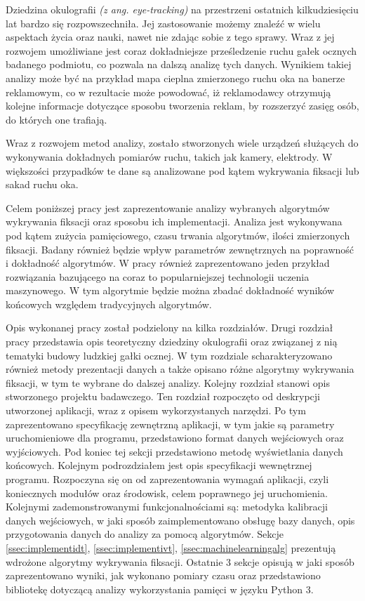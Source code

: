 Dziedzina okulografii \textit{(z ang. eye-tracking)} na przestrzeni ostatnich kilkudziesięciu lat bardzo się rozpowszechniła. Jej zastosowanie możemy znaleźć w wielu aspektach życia oraz nauki, nawet nie zdając sobie z tego sprawy. Wraz z jej rozwojem umożliwiane jest coraz dokładniejsze prześledzenie ruchu gałek ocznych badanego podmiotu, co pozwala na dalszą analizę tych danych. Wynikiem takiej analizy może być na przykład mapa cieplna zmierzonego ruchu oka na banerze reklamowym, co w rezultacie może powodować, iż reklamodawcy otrzymują kolejne informacje dotyczące sposobu tworzenia reklam, by rozszerzyć zasięg osób, do których one trafiają.\par
Wraz z rozwojem metod analizy, zostało stworzonych wiele urządzeń służących do wykonywania dokładnych pomiarów ruchu, takich jak kamery, elektrody. W większości przypadków te dane są analizowane pod kątem wykrywania fiksacji lub sakad ruchu oka.\par
Celem poniższej pracy jest zaprezentowanie analizy wybranych algorytmów wykrywania fiksacji oraz sposobu ich implementacji. Analiza jest wykonywana pod kątem zużycia pamięciowego, czasu trwania algorytmów, ilości zmierzonych fiksacji. Badany również będzie wpływ parametrów zewnętrznych na poprawność i dokładność algorytmów. W pracy również zaprezentowano jeden przykład rozwiązania bazującego na coraz to popularniejszej technologii uczenia maszynowego. W tym algorytmie będzie można zbadać dokładność wyników końcowych względem tradycyjnych algorytmów.\par
Opis wykonanej pracy został podzielony na kilka rozdziałów. Drugi rozdział pracy przedstawia opis teoretyczny dziedziny okulografii oraz związanej z nią tematyki budowy ludzkiej gałki ocznej. W tym rozdziale scharakteryzowano również metody prezentacji danych a także opisano różne algorytmy wykrywania fiksacji, w tym te wybrane do dalszej analizy. Kolejny rozdział stanowi opis stworzonego projektu badawczego. Ten rozdział rozpoczęto od deskrypcji utworzonej aplikacji, wraz z opisem wykorzystanych narzędzi. Po tym zaprezentowano specyfikację zewnętrzną aplikacji, w tym jakie są parametry uruchomieniowe dla programu, przedstawiono format danych wejściowych oraz wyjściowych. Pod koniec tej sekcji przedstawiono metodę wyświetlania danych końcowych. Kolejnym podrozdziałem jest opis specyfikacji wewnętrznej programu. Rozpoczyna się on od zaprezentowania wymagań aplikacji, czyli koniecznych modułów oraz środowisk, celem poprawnego jej uruchomienia. Kolejnymi zademonstrowanymi funkcjonalnościami są: metodyka kalibracji danych wejściowych, w jaki sposób zaimplementowano obsługę bazy danych, opis przygotowania danych do analizy za pomocą algorytmów. Sekcje \ref{ssec:implementidt}, \ref{ssec:implementivt}, \ref{ssec:machinelearningalg} prezentują wdrożone algorytmy wykrywania fiksacji. Ostatnie 3 sekcje opisują w jaki sposób zaprezentowano wyniki, jak wykonano pomiary czasu oraz  przedstawiono bibliotekę dotyczącą analizy wykorzystania pamięci w języku Python 3.\\
